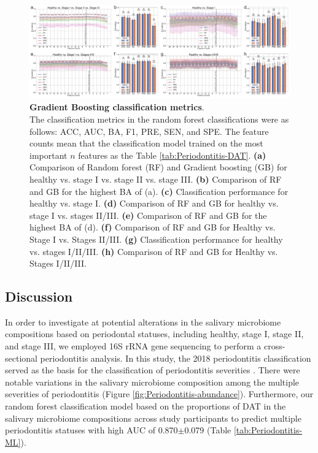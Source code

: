 \documentclass[11pt, a4paper, onecolumn, oneside]{report}
\begin{document}
            \begin{figure}[p]
                \centering
                \includegraphics[width=\linewidth]{Figures/Periodontitis/Figure_R09.pdf}
                \caption[Gradient Boosting classification metrics]{\textbf{Gradient Boosting classification metrics}. \\
                    The classification metrics in the random forest classifications were as follows: ACC, AUC, BA, F1, PRE, SEN, and SPE. The feature counts mean that the classification model trained on the most important $n$ features as the Table \ref{tab:Periodontitis-DAT}. \textbf{(a)} Comparison of Random forest (RF) and Gradient boosting (GB) for healthy vs. stage I vs. stage II vs. stage III. \textbf{(b)} Comparison of RF and GB for the highest BA of (a). \textbf{(c)} Classification performance for healthy vs. stage I. \textbf{(d)} Comparison of RF and GB for healthy vs. stage I vs. stages II/III. \textbf{(e)} Comparison of RF and GB for the highest BA of (d). \textbf{(f)} Comparison of RF and GB for Healthy vs. Stage I vs. Stages II/III. \textbf{(g)} Classification performance for healthy vs. stages I/II/III. \textbf{(h)} Comparison of RF and GB for Healthy vs. Stages I/II/III.}
                \label{fig:Periodontitis-GB}
            \end{figure}
            \clearpage
        \newpage

        \subsection{Discussion}
            In order to investigate at potential alterations in the salivary microbiome compositions based on periodontal statuses, including healthy, stage I, stage II, and stage III, we employed 16S rRNA gene sequencing to perform a cross-sectional periodontitis analysis. In this study, the 2018 periodontitis classification served as the basis for the classification of periodontitis severities \cite{Periodontitis-4}. There were notable variations in the salivary microbiome composition among the multiple severities of periodontitis (Figure \ref{fig:Periodontitis-abundance}). Furthermore, our random forest classification model based on the proportions of DAT in the salivary microbiome compositions across study participants to predict multiple periodontitis statuses with high AUC of 0.870$\pm$0.079 (Table \ref{tab:Periodontitis-ML}).
\end{document}

